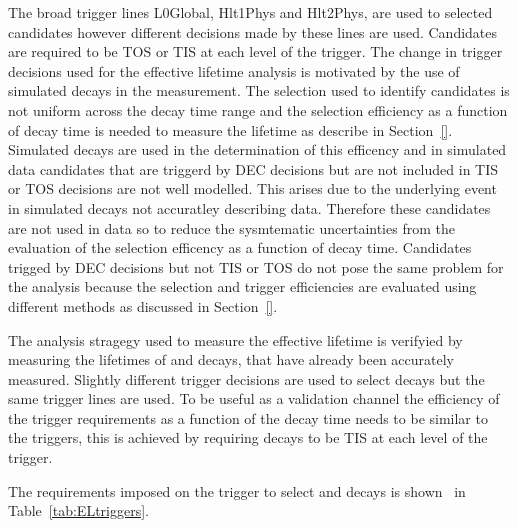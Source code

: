 The broad trigger lines L0Global, Hlt1Phys and Hlt2Phys, are used to selected \bsmumu candidates however different decisions made by these lines are used. Candidates are required to be TOS or TIS at each level of the trigger. The change in trigger decisions used for the effective lifetime analysis is motivated by the use of simulated decays in the measurement. The selection used to identify candidates is not uniform across the decay time range and the selection efficiency as a function of decay time is needed to measure the lifetime as describe in Section~\ref{}. Simulated \bsmumu decays are used in the determination of this efficency and in simulated data candidates that are triggerd by DEC decisions but are not included in TIS or TOS decisions are not well modelled. This arises due to the underlying event in simulated decays not accuratley describing data. Therefore these candidates are not used in data so to reduce the sysmtematic uncertainties from the evaluation of the selection efficency as a function of decay time. 
Candidates trigged by DEC decisions but not TIS or TOS do not pose the same problem for the \BF analysis because the selection and trigger efficiencies are evaluated using different methods as discussed in Section~\ref{}.

The analysis stragegy used to measure the \bsmumu effective lifetime is verifyied by measuring the lifetimes of \bdkpi and \bskk decays, that have already been accurately measured. Slightly different trigger decisions are used to select \bhh decays but the same trigger lines are used. To be useful as a validation channel the efficiency of the trigger requirements as a function of the decay time needs to be similar to the \bsmumu triggers, this is achieved by requiring \bhh decays to be TIS at each level of the trigger.

The requirements imposed on the trigger to select \bsmumu and \bhh decays is shown \
in Table~\ref{tab:ELtriggers}.

